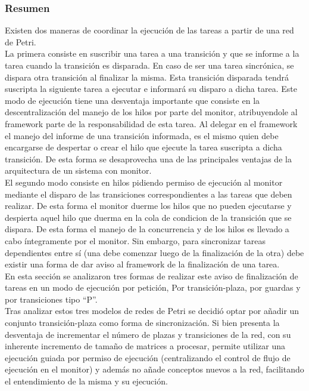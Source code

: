 \subsubsection{Resumen}
Existen dos maneras de coordinar la ejecución de las tareas a partir de una red
de Petri.\\ 
La primera consiste en suscribir una tarea a una transición y que se
informe a la tarea cuando la transición es disparada. En caso de ser
una tarea sincrónica, se dispara otra transición al finalizar la misma. Esta
transición disparada tendrá suscripta la siguiente tarea a ejecutar e informará
su disparo a dicha tarea. Este modo de ejecución tiene una desventaja
importante que consiste en la descentralización del manejo de los hilos por
parte del monitor, atribuyendole al framework parte de la responsabilidad de
esta tarea. Al delegar en el framework el manejo del informe de una transición
informada, es el mismo quien debe encargarse de despertar o crear el hilo que
ejecute la tarea suscripta a dicha transición. De esta forma se desaprovecha
una de las principales ventajas de la arquitectura de un sistema con monitor.\\
El segundo modo consiste en hilos pidiendo permiso de ejecución al monitor
mediante el disparo de las transiciones correspondientes a las tareas que deben
realizar. De esta forma el monitor duerme los hilos que no pueden ejecutarse y
despierta aquel hilo que duerma en la cola de condicion de la
transición que se dispara. De esta forma el manejo de la concurrencia y de los
hilos es llevado a cabo íntegramente por el monitor. Sin embargo, para
sincronizar tareas dependientes entre sí (una debe comenzar luego de la
finalización de la otra) debe existir una forma de dar aviso al framework de la
finalización de una tarea.\\
En esta sección se analizaron tres formas de realizar este aviso de finalización
de tareas en un modo de ejecución por petición, Por transición-plaza, por
guardas y por transiciones tipo ``P''.\\
 Tras analizar estos tres modelos de redes de Petri se decidió optar por añadir
 un conjunto transición-plaza como forma de sincronización. Si bien presenta la
 desventaja de incrementar el número de plazas y transiciones de la red, con su
 inherente incremento de tamaño de matrices a procesar, permite utilizar una
 ejecución guiada por permiso de ejecución (centralizando el control de flujo
 de ejecución en el monitor) y además no añade conceptos nuevos a la red,
 facilitando el entendimiento de la misma y su ejecución.
